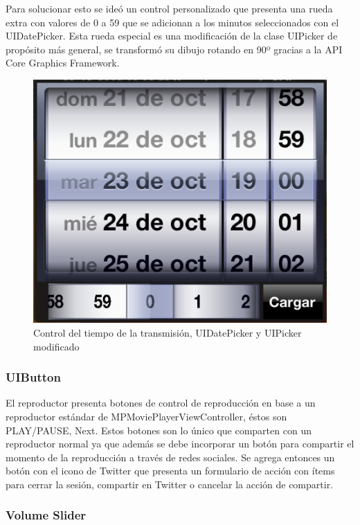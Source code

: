 Para solucionar esto se ideó un control personalizado que presenta una rueda extra con valores de 0 a 59 que se adicionan a los minutos seleccionados con el UIDatePicker. Esta rueda especial es una modificación de la clase UIPicker de propósito más general, se transformó su dibujo rotando en 90º gracias a la API Core Graphics Framework. 

\begin{figure}[H]
	\centering
	\includegraphics[scale=0.5]{imgs/datepicker-mod.png}
	\caption{Control del tiempo de la transmisión, UIDatePicker y UIPicker modificado}
	\label{datepicker-mod}	
\end{figure}
 
		\subsubsection{UIButton}
		El reproductor presenta botones de control de reproducción en base a un reproductor estándar de MPMoviePlayerViewController, éstos son PLAY/PAUSE, Next. Estos botones son lo único que comparten con un reproductor normal ya que además se debe incorporar un botón para compartir el momento de la reproducción a través de redes sociales. Se agrega entonces un botón con el icono de Twitter que presenta un formulario de acción con ítems para cerrar la sesión, compartir en Twitter o cancelar la acción de compartir.
		
		\subsubsection{Volume Slider}

